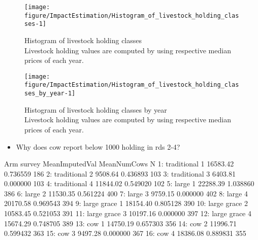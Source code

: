 \begin{Schunk}
\begin{figure}

{\centering \texttt{[image: figure/ImpactEstimation/Histogram\_of\_livestock\_holding\_classes-1]} 

}

\caption{Histogram of livestock holding classes\\ {\footnotesize Livestock holding values are computed by using respective median prices of each year.\setlength{\baselineskip}{8pt}}}\label{Figure Histogram of livestock holding classes}
\end{figure}
\end{Schunk}
\begin{Schunk}
\begin{figure}

{\centering \texttt{[image: figure/ImpactEstimation/Histogram\_of\_livestock\_holding\_classes\_by\_year-1]} 

}

\caption{Histogram of livestock holding classes by year\\ {\footnotesize Livestock holding values are computed by using respective median prices of each year.\setlength{\baselineskip}{8pt}}}\label{Figure Histogram of livestock holding classes by year}
\end{figure}
\end{Schunk}
\begin{itemize}
\vspace{1.0ex}\setlength{\itemsep}{1.0ex}\setlength{\baselineskip}{12pt}
\item	Why does \textsf{cow} report below 1000 holding in rds 2-4?
\end{itemize}
\begin{Schunk}
\begin{Soutput}
            Arm survey MeanImputedVal MeanNumCows   N
 1: traditional      1       16583.42    0.736559 186
 2: traditional      2        9508.64    0.436893 103
 3: traditional      3        6403.81    0.000000 103
 4: traditional      4       11844.02    0.549020 102
 5:       large      1       22288.39    1.038860 386
 6:       large      2       11530.35    0.561224 400
 7:       large      3        9759.15    0.000000 402
 8:       large      4       20170.58    0.969543 394
 9: large grace      1       18154.40    0.805128 390
10: large grace      2       10583.45    0.521053 391
11: large grace      3       10197.16    0.000000 397
12: large grace      4       15674.29    0.748705 389
13:         cow      1       14750.19    0.657303 356
14:         cow      2       11996.71    0.599432 363
15:         cow      3        9497.28    0.000000 367
16:         cow      4       18386.08    0.889831 355
\end{Soutput}
\end{Schunk}
